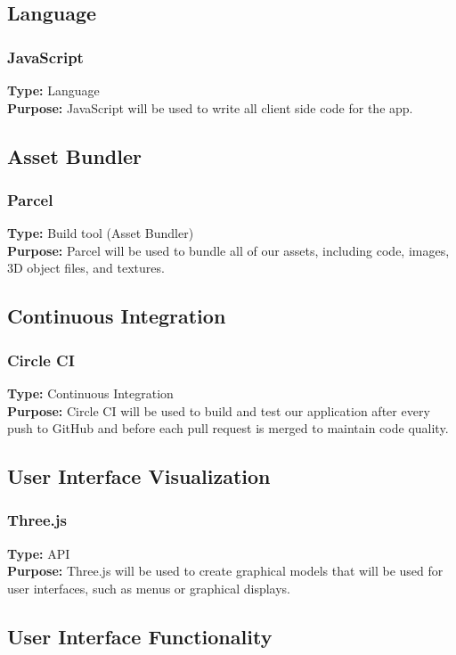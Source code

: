 \documentclass[onecolumn, draftclsnofoot,10pt, compsoc]{IEEEtran}
\begin{document}
\subsection{Language}
\subsubsection{JavaScript}
\textbf{Type:} Language\\
\textbf{Purpose:} JavaScript will be used to write all client side code for the app.

\subsection{Asset Bundler}
\subsubsection{Parcel}
\textbf{Type:} Build tool (Asset Bundler)\\
\textbf{Purpose:} Parcel will be used to bundle all of our assets, including code, images, 3D object files, and textures.

\subsection{Continuous Integration}
\subsubsection{Circle CI}
\textbf{Type:} Continuous Integration\\
\textbf{Purpose:} Circle CI will be used to build and test our application after every push to GitHub and before each pull request is merged to maintain code quality.

\subsection{User Interface Visualization}
\subsubsection{Three.js}
\textbf{Type:} API\\
\textbf{Purpose:} Three.js will be used to create graphical models that will be used for user interfaces, such as menus or graphical displays.

\subsection{User Interface Functionality}
\end{document}
